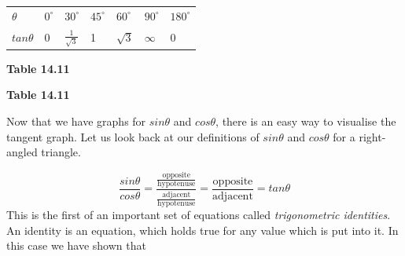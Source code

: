 \begin{table}[H]
\begin{center}
\label{m39414*id89593}
\noindent
{}
\tablelasttail{}
\begin{xtabular}[t]{|l|l|l|l|l|l|l|}\hline
    $\theta $
    &
    ${0}^{\circ }$
    &
    ${30}^{\circ }$
    &
    ${45}^{\circ }$
    &
    ${60}^{\circ }$
    &
    ${90}^{\circ }$
    &
    ${180}^{\circ }$
\tabularnewline{}
    $tan\theta $
    &
0 &
    $\frac{1}{\sqrt{3}}$
    &
1 &
    $\sqrt{3}$
    &
    $\infty $
    &
0%
\tabularnewline{}
\end{xtabular}
\end{center}
\begin{center}{\small\bfseries Table 14.11}\end{center}
\begin{caption}{\small\bfseries Table 14.11}\end{caption}
\end{table}
\par
\label{m39414*id89839}Now that we have graphs for $sin\theta $ and $cos\theta $, there is an easy way to visualise the tangent graph. Let us look back at our definitions of $sin\theta $ and $cos\theta $ for a right-angled triangle.\par 
\label{m39414*id89902}\nopagebreak\noindent{}
\begin{equation}
\frac{sin\theta }{cos\theta }=\frac{\frac{\mathrm{opposite}}{\mathrm{hypotenuse}}}{\frac{\mathrm{adjacent}}{\mathrm{hypotenuse}}}=\frac{\mathrm{opposite}}{\mathrm{adjacent}}=tan\theta \tag{14.36}
\end{equation}
\label{m39414*id89965}This is the first of an important set of equations called \textsl{trigonometric identities}. An identity is an equation, which holds true for any value which is put into it. In this case we have shown that\par 
\label{m39414*id89978}\nopagebreak\noindent{}
